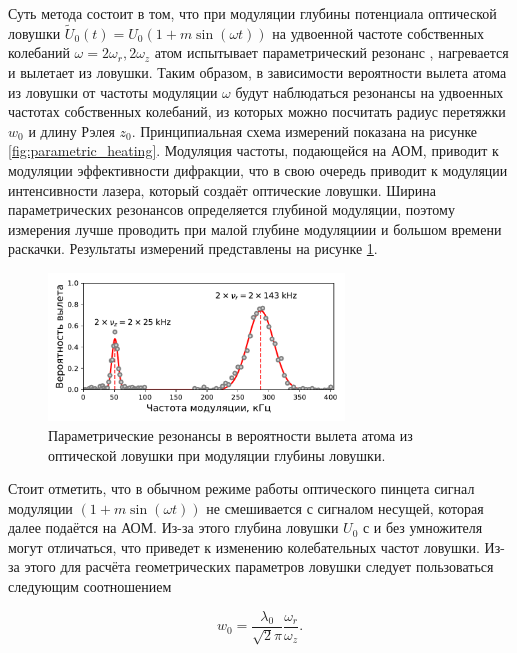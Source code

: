 Суть метода состоит в том, что при модуляции глубины потенциала оптической ловушки $\tilde{U}_0(t) = U_0 (1 + m \sin(\omega t))$ на удвоенной частоте собственных колебаний $\omega = 2\omega_r, 2\omega_z$ атом испытывает параметрический резонанс \cite{LL_mechanics}, нагревается и вылетает из ловушки. Таким образом, в зависимости вероятности вылета атома из ловушки от частоты модуляции $\omega$ будут наблюдаться резонансы на удвоенных частотах собственных колебаний, из которых можно посчитать радиус перетяжки $w_0$ и длину Рэлея $z_0$. Принципиальная схема измерений показана на рисунке \ref{fig:parametric_heating}. Модуляция частоты, подающейся на АОМ, приводит к модуляции эффективности дифракции, что в свою очередь приводит к модуляции интенсивности лазера, который создаёт оптические ловушки. Ширина параметрических резонансов определяется глубиной модуляции, поэтому измерения лучше проводить при малой глубине модуляциии и большом времени раскачки. Результаты измерений представлены на рисунке \ref{fig:oscillation_frequencies}. 

\begin{figure}[ht]
	\centering
	\includegraphics[width=0.7\textwidth]{images/oscillation_frequencies.pdf}
	\caption{Параметрические резонансы в вероятности вылета атома из оптической ловушки при модуляции глубины ловушки.}
	\label{fig:oscillation_frequencies}
\end{figure}

Стоит отметить, что в обычном режиме работы оптического пинцета сигнал модуляции $(1+m\sin(\omega t))$ не смешивается с сигналом несущей, которая далее подаётся на АОМ. Из-за этого глубина ловушки $U_0$ с и без умножителя могут отличаться, что приведет к изменению колебательных частот ловушки. Из-за этого для расчёта геометрических параметров ловушки следует пользоваться следующим соотношением

\begin{equation}
	w_0 = \frac{\lambda_0}{\sqrt{2}\pi}\frac{\omega_r}{\omega_z}.
	\label{eq:w0}
\end{equation}

